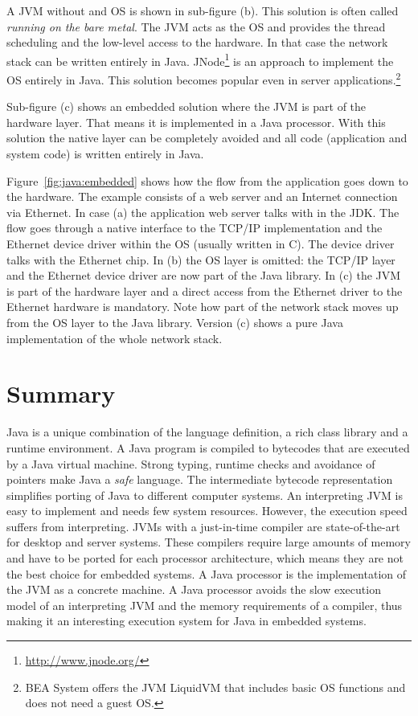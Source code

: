 A JVM without and OS is shown in sub-figure (b). This solution is
often called \emph{running on the bare metal}. The JVM acts as the OS
and provides the thread scheduling and the low-level access to the
hardware. In that case the network stack can be written entirely in
Java. JNode\footnote{\url{http://www.jnode.org/}} is an approach to
implement the OS entirely in Java. This solution becomes popular even
in server applications.\footnote{BEA System offers the JVM LiquidVM
that includes basic OS functions and does not need a guest OS.
}

Sub-figure (c) shows an embedded solution where the JVM is part of
the hardware layer. That means it is implemented in a Java
processor. With this solution the native layer can be completely
avoided and all code (application and system code) is written
entirely in Java.

Figure~\ref{fig:java:embedded} shows how the flow from the
application goes down to the hardware. The example consists of a web
server and an Internet connection via Ethernet. In case (a) the
application web server talks with  in the JDK. The
flow goes through a native interface to the TCP/IP implementation and
the Ethernet device driver within the OS (usually written in C). The
device driver talks with the Ethernet chip. In (b) the OS layer is
omitted: the TCP/IP layer and the Ethernet device driver are now part
of the Java library. In (c) the JVM is part of the hardware layer and
a direct access from the Ethernet driver to the Ethernet hardware is
mandatory. Note how part of the network stack moves up from the OS
layer to the Java library. Version (c) shows a pure Java
implementation of the whole network stack.


\section{Summary}

Java is a unique combination of the language definition, a rich
class library and a runtime environment. A Java program is compiled
to bytecodes that are executed by a Java virtual machine. Strong
typing, runtime checks and avoidance of pointers make Java a
\emph{safe} language. The intermediate bytecode representation
simplifies porting of Java to different computer systems. An
interpreting JVM is easy to implement and needs few system
resources. However, the execution speed suffers from interpreting.
JVMs with a just-in-time compiler are state-of-the-art for desktop
and server systems. These compilers require large amounts of memory
and have to be ported for each processor architecture, which means
they are not the best choice for embedded systems. A Java processor
is the implementation of the JVM as a concrete machine. A Java
processor avoids the slow execution model of an interpreting JVM and
the memory requirements of a compiler, thus making it an interesting
execution system for Java in embedded systems.
